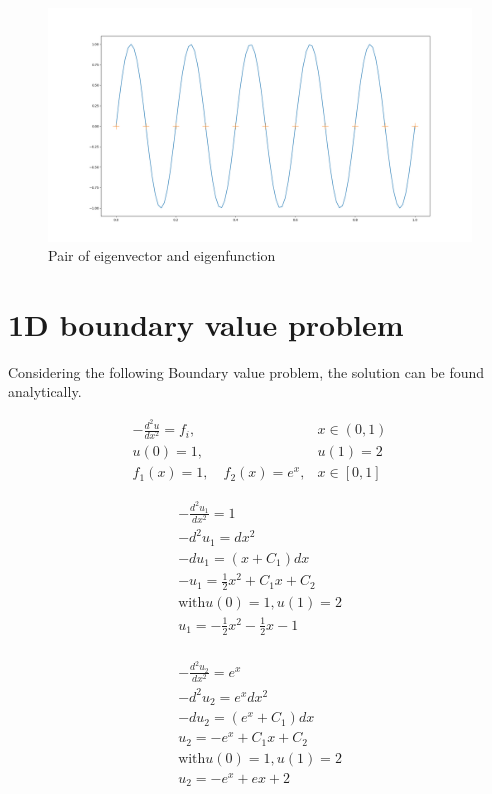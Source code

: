 \documentclass{article}
\begin{document}
\begin{figure}[H]
	\centering
	\includegraphics[width=.9\linewidth]{1thpair.png}
	\caption{ Pair of eigenvector and eigenfunction}
\end{figure}

\section{1D boundary value problem}
Considering the following Boundary value problem, the solution can be found analytically.

\begin{align}
    -\frac{d^{2} u}{d x^{2}}=f_{i}, & x \in(0,1) \\ u(0)=1, & u(1)=2 \\ f_{1}(x)=1, \quad f_{2}(x)=e^{x}, & x \in[0,1]
\end{align}

\begin{align}
    -\frac{d^{2} u_1}{d x^{2}}=1 \\
    - d^2 u_1 = dx^2 \\
    - d u_1 = (x+C_1) dx\\
    - u_1 = \frac{1}{2}x^2 + C_1 x + C_2\\
    \text{with} u(0)=1,  u(1)=2 \\
    u_1 = -\frac{1}{2}x^2 - \frac{1}{2} x - 1\\
\end{align}

\begin{align}
    -\frac{d^{2} u_2}{d x^{2}}=e^x \\
    -d^2 u_2 = e^x dx^2 \\
    -d u_2 = (e^x+C_1) dx\\
    u_2 = -e^x + C_1 x + C_2\\
    \text{with} u(0)=1,  u(1)=2 \\
    u_2 = -e^x + e x + 2\\
\end{align}
\end{document}
